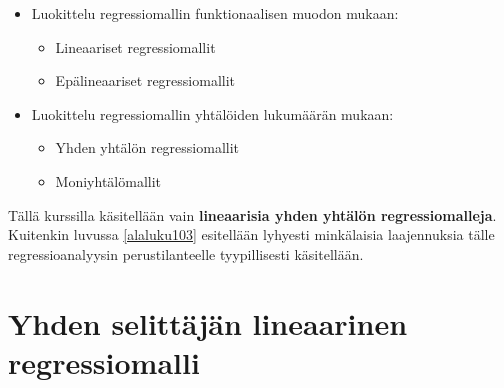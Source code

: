 \documentclass[
]{book}
\providecommand{\tightlist}{%
  \setlength{\itemsep}{0pt}\setlength{\parskip}{0pt}}
\begin{document}
\begin{itemize}
  \begin{itemize}
  \tightlist
  \item
    Luokittelu regressiomallin funktionaalisen muodon mukaan:

    \begin{itemize}
    \tightlist
    \item
      Lineaariset regressiomallit
    \item
      Epälineaariset regressiomallit
    \end{itemize}
  \item
    Luokittelu regressiomallin yhtälöiden lukumäärän mukaan:

    \begin{itemize}
    \tightlist
    \item
      Yhden yhtälön regressiomallit
    \item
      Moniyhtälömallit
    \end{itemize}
  \end{itemize}
\end{itemize}

Tällä kurssilla käsitellään vain \textbf{lineaarisia yhden yhtälön regressiomalleja}. Kuitenkin luvussa \ref{alaluku103} esitellään lyhyesti minkälaisia laajennuksia tälle regressioanalyysin perustilanteelle tyypillisesti käsitellään.

\hypertarget{alaluku102}{%
\section{Yhden selittäjän lineaarinen regressiomalli}\label{alaluku102}}
\end{document}
